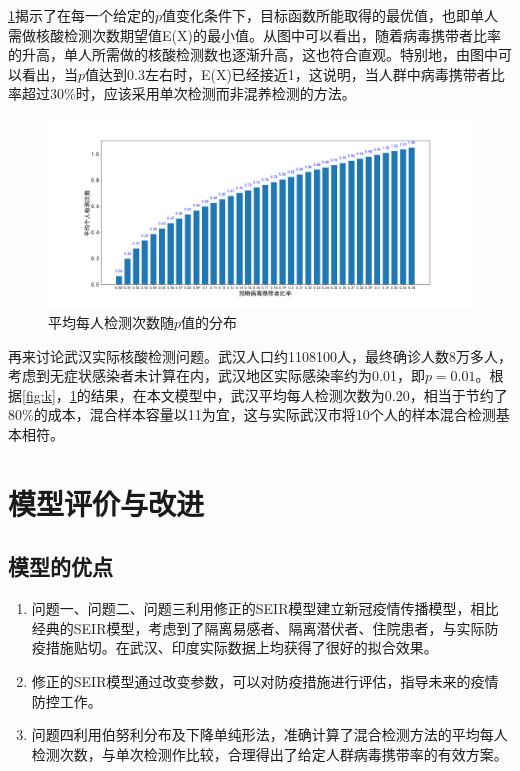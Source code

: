 \documentclass[withoutpre]{cumcmthesis} %
\begin{document}
\cref{fig:average}揭示了在每一个给定的$p$值变化条件下，目标函数所能取得的最优值，也即单人需做核酸检测次数期望值E(X)的最小值。从图中可以看出，随着病毒携带者比率的升高，单人所需做的核酸检测数也逐渐升高，这也符合直观。特别地，由图中可以看出，当$p$值达到0.3左右时，E(X)已经接近1，这说明，当人群中病毒携带者比率超过30\%时，应该采用单次检测而非混养检测的方法。

\begin{figure}[!h]
    \centering
    \includegraphics[width=1.0\textwidth]{figures/average_detect.png}
    \caption{平均每人检测次数随$p$值的分布}
    \label{fig:average}
\end{figure}

再来讨论武汉实际核酸检测问题。武汉人口约1108100人，最终确诊人数8万多人，考虑到无症状感染者未计算在内，武汉地区实际感染率约为0.01，即$p=0.01$。根据\cref{fig:k}，\cref{fig:average}的结果，在本文模型中，武汉平均每人检测次数为0.20，相当于节约了80\%的成本，混合样本容量以11为宜，这与实际武汉市将10个人的样本混合检测基本相符。


\section{模型评价与改进}
\subsection{模型的优点}
\begin{enumerate}
    \item 问题一、问题二、问题三利用修正的SEIR模型建立新冠疫情传播模型，相比经典的SEIR模型，考虑到了隔离易感者、隔离潜伏者、住院患者，与实际防疫措施贴切。在武汉、印度实际数据上均获得了很好的拟合效果。
    \item 修正的SEIR模型通过改变参数，可以对防疫措施进行评估，指导未来的疫情防控工作。
    \item 问题四利用伯努利分布及下降单纯形法，准确计算了混合检测方法的平均每人检测次数，与单次检测作比较，合理得出了给定人群病毒携带率的有效方案。
\end{enumerate}
\end{document}
